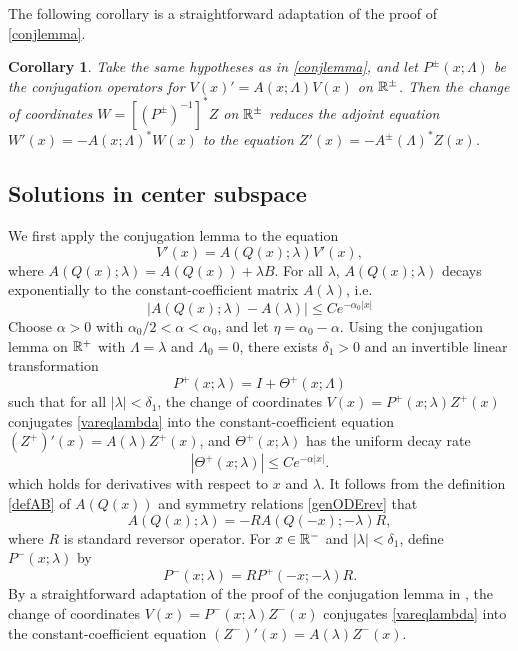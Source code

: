 \documentclass[10pt,reqno]{amsart}
\theoremstyle{plain}
\newtheorem{corollary}[theorem]{Corollary}
\theoremstyle{definition}
\theoremstyle{remark}
\numberwithin{theorem}{section}
\numberwithin{equation}{section}
\begin{document}
The following corollary is a straightforward adaptation of the proof of \cref{conjlemma}.

\begin{corollary}\label{corr:adjconj}
Take the same hypotheses as in \cref{conjlemma}, and let $P^\pm(x; \Lambda)$ be the conjugation operators for $V(x)' = A(x; \Lambda) V(x)$ on $\mathbb{R}^\pm$. Then the change of coordinates $W = [(P^\pm)^{-1}]^* Z$ on $\mathbb{R}^\pm$ reduces the adjoint equation $W'(x) = -A(x; \Lambda)^* W(x)$ to the equation $Z'(x) = -A^\pm(\Lambda)^* Z(x)$.
\end{corollary}

\subsection{Solutions in center subspace}\label{sec:conjvareq}

We first apply the conjugation lemma to the equation
\begin{equation}\label{vareqlambda}
V'(x) = A(Q(x); \lambda) V'(x),
\end{equation}
where $A(Q(x); \lambda) = A(Q(x)) + \lambda B$. For all $\lambda$, $A(Q(x); \lambda)$ decays exponentially to the constant-coefficient matrix $A(\lambda)$, i.e. 
\[
|A(Q(x); \lambda) - A(\lambda)| \leq C e^{-\alpha_0 |x|}
\]
Choose $\alpha > 0$ with $\alpha_0/2 < \alpha < \alpha_0$, and let $\eta = \alpha_0 - \alpha$. Using the conjugation lemma on $\mathbb{R}^+$ with $\Lambda = \lambda$ and $\Lambda_0 = 0$, there exists $\delta_1 > 0$ and an invertible linear transformation 
\begin{equation}\label{defPplus}
P^+(x; \lambda) = I + \Theta^+(x; \Lambda)
\end{equation}
such that for all $|\lambda| < \delta_1$, the change of coordinates $V(x) = P^+(x; \lambda) Z^+(x)$ conjugates \cref{vareqlambda} into the constant-coefficient equation $(Z^+)'(x) = A(\lambda) Z^+(x)$, and $\Theta^+(x; \lambda)$ has the uniform decay rate
\begin{equation}\label{Thetadecay}
|\Theta^+(x; \lambda)| \leq C e^{-\alpha |x|}.
\end{equation}
which holds for derivatives with respect to $x$ and $\lambda$. It follows from the definition \cref{defAB} of $A(Q(x))$ and symmetry relations \cref{genODErev} that 
\begin{equation}\label{AQsymmetry}
A(Q(x); \lambda) = -R A(Q(-x); -\lambda)R,
\end{equation}
where $R$ is standard reversor operator. For $x \in \mathbb{R}^-$ and $|\lambda| < \delta_1$, define $P^-(x; \lambda)$ by
\begin{equation}\label{defPminus}
P^-(x; \lambda) = RP^+(-x; -\lambda)R.
\end{equation}
By a straightforward adaptation of the proof of the conjugation lemma in \cite{Zumbrun2009}, the change of coordinates $V(x) = P^-(x; \lambda) Z^-(x)$ conjugates \cref{vareqlambda} into the constant-coefficient equation $(Z^-)'(x) = A(\lambda) Z^-(x)$.
\end{document}
